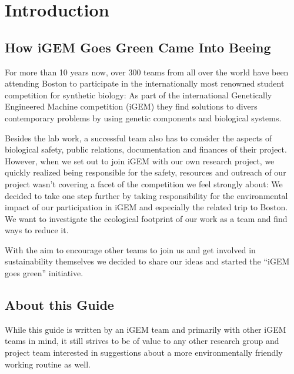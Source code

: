 
\chapter*{Introduction}
\section*{How iGEM Goes Green Came Into Beeing}
For more than 10 years now, over 300 teams from all over the world have been attending Boston to participate in the internationally most renowned student competition for synthetic biology: As part of the international Genetically Engineered Machine competition (iGEM) they find solutions to divers contemporary problems by using genetic components and biological systems.

Besides the lab work, a successful team also has to consider the aspects of  biological safety, public relations, documentation and finances of their project. However, when we set out to join iGEM with our own research project, we quickly realized being responsible for the safety, resources and outreach of our project wasn't covering a facet of the competition we feel strongly about: We decided to take one step further by taking responsibility for the environmental impact of our participation in iGEM and especially the related trip to Boston. We want to investigate the ecological footprint of our work as a team and find ways to reduce it. 

With the aim to encourage other teams to join us and get involved in sustainability themselves we decided to share our ideas and started the “iGEM goes green” initiative.

\section*{About this Guide}
While this guide is written by an iGEM team and primarily with other iGEM teams in mind, it still strives to be of value to any other research group and project team interested in suggestions about a more environmentally friendly working routine as well.

